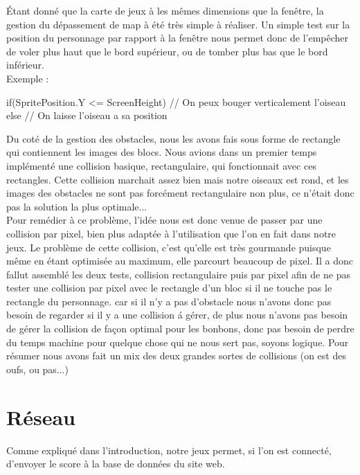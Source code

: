 \documentclass [11pt]{report}
\begin{document}
		\indent Étant donné que la carte de jeux à les mêmes dimensions que la fenêtre, la gestion du dépassement de map à été très simple à réaliser. Un simple test sur la position du personnage par rapport à la fenêtre nous permet donc de l'empêcher de voler plus haut que le bord supérieur, ou de tomber plus bas que le bord inférieur. \\

		
		Exemple :
		
		\begin{mylisting}
		
if(SpritePosition.Y <= ScreenHeight)
{
	// On peux bouger verticalement l'oiseau
}
else
{
	// On laisse l'oiseau a sa position
}
		\end{mylisting}
	\vspace{10mm}
		
				
		\indent Du coté de la gestion des obstacles, nous les avons fais sous forme de rectangle qui contiennent les images des blocs. Nous avions dans un premier temps implémenté une collision basique, rectangulaire, qui fonctionnait avec ces rectangles. Cette collision marchait assez bien mais notre oiseaux est rond, et les images des obstacles ne sont pas forcément rectangulaire non plus, ce n'était donc pas la solution la plus optimale... \\
		\indent Pour remédier à ce problème, l'idée nous est donc venue de passer par une collision par pixel, bien plus adaptée à l'utilisation que l'on en fait dans notre jeux. Le problème de cette collision, c'est qu'elle est très gourmande puisque même en étant optimisée au maximum, elle parcourt beaucoup de pixel. Il a donc fallut assemblé les deux tests, collision rectangulaire puis par pixel afin de ne pas tester une collision par pixel avec le rectangle d'un bloc si il ne touche pas le rectangle du personnage. car si il n'y a pas d'obstacle nous n'avons donc pas besoin de regarder si il y a une collision \'a g\'erer, de plus nous n'avons pas besoin de g\'erer la collision de façon optimal pour les bonbons, donc pas besoin de perdre du temps machine pour quelque chose qui ne nous sert pas, soyons logique. Pour résumer nous avons fait un mix des deux grandes sortes de collisions (on est des oufs, ou pas...)
	
	
	\vspace{10mm}
	
	\section{Réseau}
	Comme expliqué dans l'introduction, notre jeux permet, si l'on est connecté, d'envoyer le score à la base de données du site web.\\
	
\end{document}
